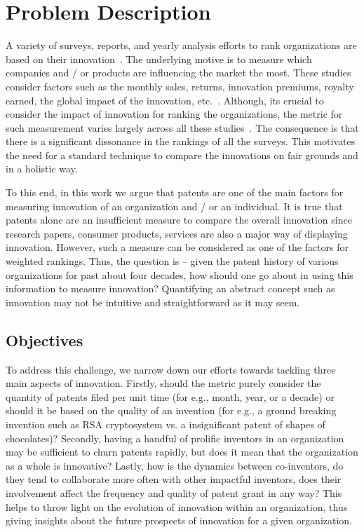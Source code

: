 \section{Problem Description}
\label{sec:prob}

A variety of surveys, reports, and yearly analysis efforts to rank
organizations are based on their innovation~\cite{247wallst, top100}. The underlying motive is to measure
which companies and / or products are influencing the market the most.  These
studies consider factors such as the monthly sales, returns, innovation
premiums, royalty earned, the global impact of the innovation, etc.~\cite{forbeshow}. Although,
its crucial to consider the impact of innovation for ranking the
organizations, the metric for such measurement  varies largely across all these 
studies~\cite{reuters-method}. The consequence is that there is a significant dissonance in the
rankings of all the surveys.  This motivates the need for a standard technique
to compare the innovations on fair grounds and in a holistic way. 

To this end, in this work we argue that patents are one of the main factors for
measuring innovation of an organization and / or an individual. It is true
that patents alone are an insufficient measure to compare the overall
innovation since research papers, consumer products, services are also a major
way of displaying innovation. However, such a measure can be considered as one
of the factors for weighted rankings. Thus, the question is -- given the patent history of
various organizations for past about four decades,  how should one go about in
using this information to measure innovation? Quantifying an abstract
concept such as innovation may not be intuitive and straightforward as it may seem.  

\subsection{Objectives}

To address this challenge, we narrow down our efforts towards tackling
three main  aspects of innovation. Firstly, should the metric purely consider
the quantity of patents filed per unit time (for e.g., month, year, or a
decade) or should it be based on the quality of an invention (for e.g., a
ground breaking invention such as RSA cryptosystem vs. a insignificant patent
of shapes of chocolates)? Secondly, having a handful of prolific inventors in
an organization may be sufficient to churn patents rapidly, but does it mean
that the organization as a whole is innovative? Lastly, how is the dynamics
between co-inventors, do they tend to collaborate more often with other
impactful inventors, does their involvement affect the frequency and quality 
of patent grant in any way? This helps to throw light on the evolution of 
innovation within an organization, thus giving insights about the future 
prospects of innovation for a given organization.

